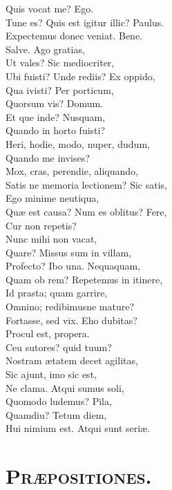 \documentclass[12pt, twocolumn]{memoir}
\begin{document}
Quis vocat me? Ego.\\
Tune es? Quis est igitur illic? Paulus.\\
Expectemus donec veniat. Bene.\\
Salve. Ago gratias,\\
Ut vales? Sic mediocriter,\\
Ubi fuisti? Unde rediis? Ex oppido,\\
Qua ivisti? Per porticum,\\
Quorsum vis? Domum.\\
Et que inde? Nusquam,\\
Quando in horto fuisti?\\
Heri, hodie, modo, nuper, dudum,\\
Quando me invises?\\
Mox, cras, perendie, aliquando,\\
Satis ne memoria lectionem? Sic satis,\\
Ego minime neutiqua,\\
Quæ est causa? Num es oblitus? Fere,\\
Cur non repetis?\\
Nunc mihi non vacat,\\
Quare? Missus sum in villam,\\
Profecto? Ibo una. Nequaquam,\\
Quam ob rem? Repetemus in itinere,\\
Id prasta; quam garrire,\\
Omnino; redibimusne mature?\\
Fortasse, sed vix. Eho dubitas?\\
Procul est, propera.\\
Ceu sutores? quid tuum?\\
Nostram ætatem decet agilitas,\\
Sic ajunt, imo sic est,\\
Ne clama. Atqui sumus soli,\\
Quomodo ludemus? Pila,\\
Quamdiu? Tetum diem,\\
Hui nimium est. Atqui sunt seriæ.\\

\section*{\textsc{Præpositiones.}}
\end{document}
